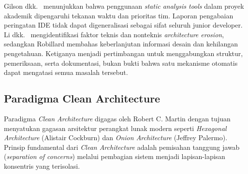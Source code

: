 \documentclass[12pt,a4paper,oneside]{report}
\begin{document}
Gilson dkk.\ \cite{gilson2020junior} menunjukkan bahwa penggunaan \textit{static analysis tools} dalam proyek akademik dipengaruhi tekanan waktu dan prioritas tim. Laporan pengabaian peringatan IDE tidak dapat digeneralisasi sebagai sifat seluruh junior developer. Li dkk.\ \cite{strasser2021understanding} mengidentifikasi faktor teknis dan nonteknis \textit{architecture erosion}, sedangkan Robillard \cite{robillard2016sustainable,robillard2021turnover} membahas keberlanjutan informasi desain dan kehilangan pengetahuan. Ketiganya menjadi pertimbangan untuk menggabungkan struktur, pemeriksaan, serta dokumentasi, bukan bukti bahwa satu mekanisme otomatis dapat mengatasi semua masalah tersebut.

\subsection{Paradigma Clean Architecture}

Paradigma \textit{Clean Architecture} digagas oleh Robert C. Martin \cite{martin2017clean} dengan tujuan menyatukan gagasan arsitektur perangkat lunak modern seperti \textit{Hexagonal Architecture} (Alistair Cockburn) dan \textit{Onion Architecture} (Jeffrey Palermo). Prinsip fundamental dari \textit{Clean Architecture} adalah pemisahan tanggung jawab (\textit{separation of concerns}) melalui pembagian sistem menjadi lapisan-lapisan konsentris yang terisolasi.
\end{document}
